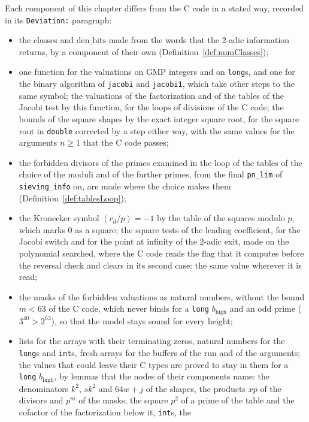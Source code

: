 Each component of this chapter differs from the C code in a stated way, recorded in its
\verb|Deviation:| paragraph:
\begin{itemize}
  \item the classes and $\mathrm{den\_bits}$ made from the words that the 2-adic information
    returns, by a component of their own (Definition~\ref{def:numClasses});
  \item one function for the valuations on GMP integers and on \verb|long|s, and one for the
    binary algorithm of \verb|jacobi| and \verb|jacobi1|, which take other steps to the same
    symbol; the valuations of the factorization and of the tables of the Jacobi test by this
    function, for the loops of divisions of the C code; the bounds of the square shapes by the exact
    integer square root, for the square root in \verb|double| corrected by a step either way, with
    the same values for the arguments $n \ge 1$ that the C code passes;
  \item the forbidden divisors of the primes examined in the loop of the tables of the choice of
    the moduli and of the further primes, from the final \verb|pn_lim| of \verb|sieving_info| on,
    are made where the choice makes them (Definition~\ref{def:tablesLoop});
  \item the Kronecker symbol $(c_d / p) = -1$ by the table of the squares modulo $p$, which marks
    $0$ as a square; the square tests of the leading coefficient, for the Jacobi switch and for the
    point at infinity of the 2-adic exit, made on the polynomial searched, where the C code reads
    the flag that it computes before the reversal check and clears in its second case: the same
    value wherever it is read;
  \item the masks of the forbidden valuations as natural numbers, without the bound $m < 63$ of the
    C code, which never binds for a \verb|long| $b_{\mathrm{high}}$ and an odd prime ($3^{40} >
    2^{63}$), so that the model stays sound for every height;
  \item lists for the arrays with their terminating zeros, natural numbers for the \verb|long|s and
    \verb|int|s, fresh arrays for the buffers of the run and of the arguments; the values
    that could leave their C types are proved to stay in them for a \verb|long| $b_{\mathrm{high}}$,
    by lemmas that the nodes of their components name: the denominators $k^2$, $s k^2$ and
    $64 w + j$ of the shapes, the products $x p$ of the divisors and $p^m$ of the masks, the square
    $p^2$ of a prime of the table and the cofactor of the factorization below it, \verb|int|s, the

\end{itemize}
